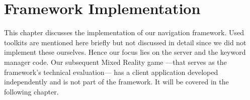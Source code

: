 
\chapter{Framework Implementation}
This chapter discusses the implementation of our navigation framework. Used toolkits are mentioned here briefly but not discussed in detail since we did not implement these ourselves. Hence our focus lies on the server and the keyword manager code. Our subsequent Mixed Reality game ---that serves as the framework's technical evaluation--- has a client application developed independently and is not part of the framework. It will be covered in the following chapter.





